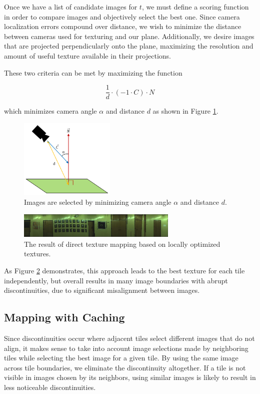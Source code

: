 \documentclass[10pt,twocolumn,letterpaper]{article}
\begin{document}
Once we have a list of candidate images for $t$, we must define a
scoring function in order to compare images and objectively select the
best one. Since camera localization errors compound over distance, we
wish to minimize the distance between cameras used for texturing and
our plane. Additionally, we desire images that are projected
perpendicularly onto the plane, maximizing the resolution and amount
of useful texture available in their projections.

These two criteria can be met by maximizing the function

\[
\frac{1}{d} \cdot (-1 \cdot C) \cdot N
\]

which minimizes camera angle $\alpha$ and distance $d$ as shown in Figure \ref{fig:scoringFunction}. 

\begin{figure}
  \centering
  \includegraphics[height=1.5in]{scoringFunction.pdf}
  \caption{Images are selected by minimizing camera angle $\alpha$ and distance $d$.}
  \label{fig:scoringFunction}
\end{figure}



\begin{figure}
  \centering
  \includegraphics[width=3in]{wall1_naive.jpg}
  \caption{The result of direct texture mapping based on locally
    optimized textures.}
  \label{fig:directMapping}
\end{figure}


As Figure \ref{fig:directMapping} demonstrates, this approach leads to
the best texture for each tile independently, but overall results in
many image boundaries with abrupt discontinuities, due to significant
misalignment between images.

\subsection{Mapping with Caching}
\label{sec:mappingWithCaching}
Since discontinuities occur where adjacent tiles select different
images that do not align, it makes sense to take into account image
selections made by neighboring tiles while selecting the best image
for a given tile. By using the same image across tile boundaries, we
eliminate the discontinuity altogether. If a tile is not visible in
images chosen by its neighbors, using similar images is likely to
result in less noticeable discontinuities.
\end{document}
